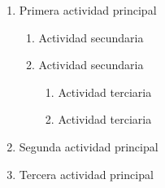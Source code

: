 \begin{enumerate}
  \item Primera actividad principal
  \begin{enumerate}[label*=\arabic*.]
    \item Actividad secundaria
    \item Actividad secundaria
    \begin{enumerate}[label*=\arabic*.]
      \item Actividad terciaria
      \item Actividad terciaria
    \end{enumerate}
  \end{enumerate}
  \item Segunda actividad principal
  \item Tercera actividad principal
\end{enumerate}
